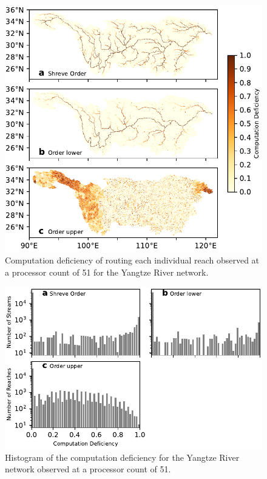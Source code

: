 \documentclass[water,article,submit,pdftex,moreauthors]{Definitions/mdpi}
\begin{document}
\begin{figure}[H]
    \includegraphics[width=11.5cm]{fig/computation_deficiency_yangtze.pdf}
    \caption{Computation deficiency of routing each individual reach observed at a processor count of 51 for the Yangtze River network. \label{fig:computation_deficiency_yangtze}}
\end{figure}

\begin{figure}[H]
    \includegraphics[width=13.5cm]{fig/computation_cost_hist_yangtze.pdf}
    \caption{Histogram of the computation deficiency for the Yangtze River network observed at a processor count of 51. \label{fig:computation_deficiency_hist_yangtze}}
\end{figure}
\end{document}
